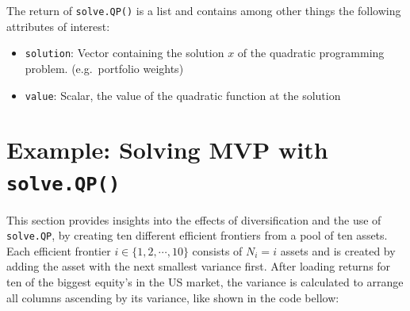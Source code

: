 \documentclass[
  oneside]{book}
\newenvironment{Shaded}{\begin{snugshade}}{\end{snugshade}}
\newcommand{\AttributeTok}[1]{\textcolor[rgb]{0.77,0.63,0.00}{#1}}
\newcommand{\CommentTok}[1]{\textcolor[rgb]{0.56,0.35,0.01}{\textit{#1}}}
\newcommand{\FunctionTok}[1]{\textcolor[rgb]{0.00,0.00,0.00}{#1}}
\newcommand{\NormalTok}[1]{#1}
\newcommand{\OtherTok}[1]{\textcolor[rgb]{0.56,0.35,0.01}{#1}}
\newcommand{\SpecialCharTok}[1]{\textcolor[rgb]{0.00,0.00,0.00}{#1}}
\newcommand{\StringTok}[1]{\textcolor[rgb]{0.31,0.60,0.02}{#1}}
\providecommand{\tightlist}{%
  \setlength{\itemsep}{0pt}\setlength{\parskip}{0pt}}
\begin{document}
The return of \texttt{solve.QP()} is a list and contains among other things the following attributes of interest:

\begin{itemize}
\tightlist
\item
  \texttt{solution}: Vector containing the solution \(x\) of the quadratic programming problem. (e.g.~portfolio weights)
\item
  \texttt{value}: Scalar, the value of the quadratic function at the solution
\end{itemize}

\hypertarget{example-solving-mvp-with-solve.qp}{%
\section{\texorpdfstring{Example: Solving MVP with \texttt{solve.QP()}}{Example: Solving MVP with solve.QP()}}\label{example-solving-mvp-with-solve.qp}}

This section provides insights into the effects of diversification and the use of \texttt{solve.QP}, by creating ten different efficient frontiers from a pool of ten assets. Each efficient frontier \(i \in \{1, 2, \cdots, 10\}\) consists of \(N_i = i\) assets and is created by adding the asset with the next smallest variance first. After loading returns for ten of the biggest equity's in the US market, the variance is calculated to arrange all columns ascending by its variance, like shown in the code bellow:

\begin{Shaded}
\end{Shaded}
\end{document}
